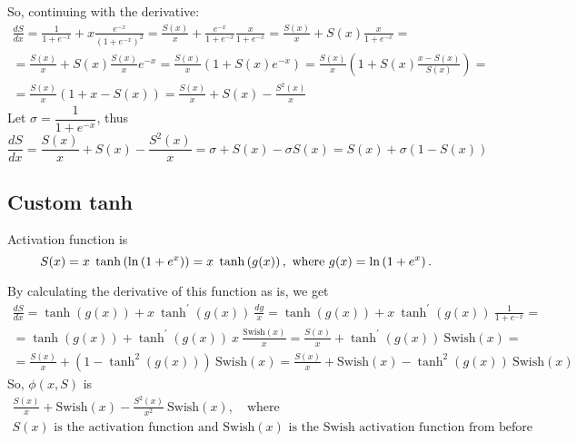So, continuing with the derivative:
\[
\begin{gathered}
\frac{dS}{dx} = \frac{1}{1+e^{-x}} + x \frac{e^{-x}}{\left( 1 + e^{-x} \right)^2} = \frac{S(x)}{x} + \frac{e^{-x}}{1+e^{-x}} \frac{x}{1+e^{-x}} = \frac{S(x)}{x} + S(x) \frac{x}{1+e^{-x}} = \\ 
= \frac{S(x)}{x} + S(x) \frac{S(x)}{x} e^{-x} = \frac{S(x)}{x} \left( 1 + S(x) e^{-x} \right) = \frac{S(x)}{x} \left( 1 + S(x)\frac{x-S(x)}{S(x)} \right) = \\
= \frac{S(x)}{x} \left( 1 + x - S(x) \right) = \frac{S(x)}{x} + S(x) - \frac{S^2(x)}{x}
\end{gathered}
\]
Let $\sigma = \dfrac{1}{1 + e^{-x}}$, thus 
\begin{equation}
\frac{dS}{dx} = \frac{S(x)}{x} + S(x) - \frac{S^2(x)}{x} = \sigma + S(x) - \sigma S(x) = S(x) + \sigma \left( 1 - S(x) \right)
\end{equation}

\subsection{Custom tanh}

Activation function is
\[
S(x) =  x \hspace{1mm} \tanh\left(\ln\left(1+e^x\right)\right) = x \hspace{1mm} \tanh\left(g(x)\right), \ \text{where} \ g(x) = \ln\left(1+e^x\right).
\]

By calculating the derivative of this function as is, we get 
\[
\begin{gathered}
\frac{dS}{dx} = \tanh(g(x)) + x \ \tanh^{'} (g(x)) \ \frac{dg}{x} = \tanh(g(x)) + x\ \tanh^{'} (g(x)) \ \frac{1}{1+e^{-x}} =\\ 
= \tanh(g(x)) + \tanh^{'} (g(x)) \ x\ \frac{\text{Swish}(x)}{x} = \frac{S(x)}{x} + \tanh^{'} (g(x)) \ \text{Swish}(x) = \\
= \frac{S(x)}{x} + (1 - \tanh^{2} (g(x))) \ \text{Swish}(x) = \frac{S(x)}{x} + \text{Swish}(x) - \tanh^{2} (g(x)) \ \text{Swish}(x)
\end{gathered}
\]
So, $\phi(x,S)$ is 
\begin{equation}
\begin{gathered}
\frac{S(x)}{x} + \text{Swish}(x) - \frac{S^2(x)}{x^2} \ \text{Swish}(x), \quad \text{where}\\
S(x) \text{ is the activation function and Swish}(x) \text{ is the Swish activation function from before}
\end{gathered}
\end{equation}
